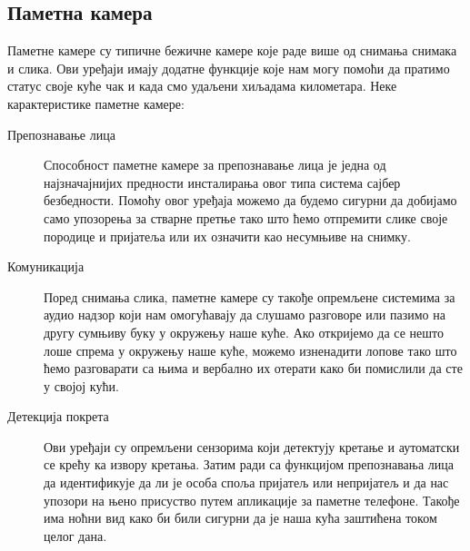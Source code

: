 \documentclass[a4paper]{article}
\begin{document}
\subsection{Паметна камера}
Паметне камере су типичне бежичне камере које раде више од снимања снимака и слика.
Ови уређаји имају додатне функције које нам могу помоћи да пратимо статус своје куће чак и када смо удаљени хиљадама километара.
\newline\newline Неке карактеристике паметне камере:
\begin{description}
    \item[Препознавање лица]
    Способност паметне камере за препознавање лица је једна од најзначајнијих предности инсталирања овог типа система сајбер безбедности.
    Помоћу овог уређаја можемо да будемо сигурни да добијамо само упозорења за стварне претње тако што ћемо отпремити слике своје породице
    и пријатеља или их означити као несумњиве на снимку.
    \item[Комуникација]
    Поред снимања слика, паметне камере су такође опремљене системима за аудио надзор који нам омогућавају да слушамо разговоре или
    пазимо на другу сумњиву буку у окружењу наше куће. Ако откријемо да се нешто лоше спрема у окружењу наше куће, можемо изненадити лопове
    тако што ћемо разговарати са њима и вербално их отерати како би помислили да сте у својој кући.
    \item[Детекција покрета]
    Ови уређаји су опремљени сензорима који детектују кретање и аутоматски се крећу ка извору кретања. Затим ради са функцијом препознавања лица да
    идентификује да ли је особа споља пријатељ или непријатељ и да нас упозори на њено присуство путем апликације за паметне телефоне.
    Такође има ноћни вид како би били сигурни да је наша кућа заштићена током целог дана.
\end{description}
\end{document}
